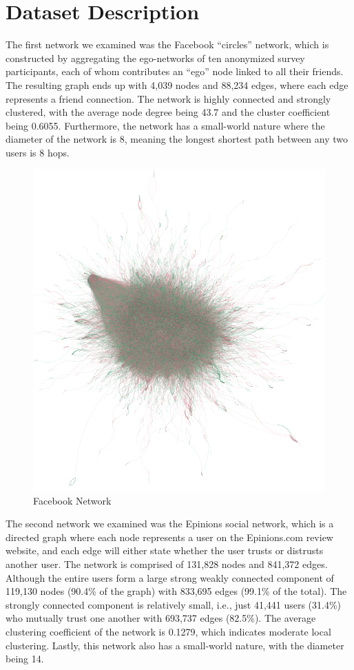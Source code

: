 \section{Dataset Description}

The first network we examined was the Facebook “circles” network, which is constructed by aggregating the ego-networks of ten anonymized survey participants, each of whom contributes an “ego” node linked to all their friends. The resulting graph ends up with 4,039 nodes and 88,234 edges, where each edge represents a friend connection. The network is highly connected and strongly clustered, with the average node degree being 43.7 and the cluster coefficient being 0.6055. Furthermore, the network has a small-world nature where the diameter of the network is 8, meaning the longest shortest path between any two users is 8 hops. 

\begin{figure}[ht]
    \centering
    \includegraphics[width=0.8\linewidth]{figures/init_fb.png}
    \caption{Facebook Network}
    \label{fig:enter-label}
\end{figure}

The second network we examined was the Epinions social network, which is a directed graph where each node represents a user on the Epinions.com review website, and each edge will either state whether the user trusts or distrusts another user. The network is comprised of 131,828 nodes and 841,372 edges. Although the entire users form a large strong weakly connected component of 119,130 nodes (90.4\% of the graph) with 833,695 edges (99.1\% of the total). The strongly connected component is relatively small, i.e., just 41,441 users (31.4\%) who mutually trust one another with 693,737 edges (82.5\%). The average clustering coefficient of the network is 0.1279, which indicates moderate local clustering. Lastly, this network also has a small-world nature, with the diameter being 14. 

